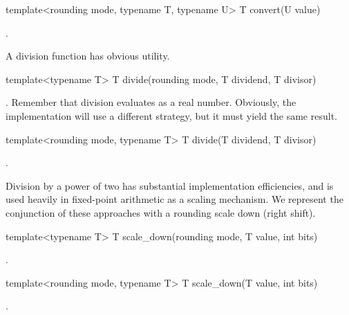 \begin{itemdecl}
template<rounding mode, typename T, typename U> T convert(U value)		
\end{itemdecl}

\begin{itemdescr}
\returns {}.	
\end{itemdescr}

A division function has obvious utility.

\begin{itemdecl}
template<typename T> T divide(rounding mode, T dividend, T divisor)		
\end{itemdecl}

\begin{itemdescr}
\returns {}. Remember that division evaluates as a real number. Obviously, the implementation will use a different strategy, but it must yield the same result.	
\end{itemdescr}

\begin{itemdecl}
template<rounding mode, typename T> T divide(T dividend, T divisor)		
\end{itemdecl}

\begin{itemdescr}
\returns {}.	
\end{itemdescr}

Division by a power of two has substantial implementation efficiencies, and is used heavily in fixed-point arithmetic as a scaling mechanism. We represent the conjunction of these approaches with a rounding scale down (right shift).

\begin{itemdecl}
template<typename T> T scale_down(rounding mode, T value, int bits)		
\end{itemdecl}

\begin{itemdescr}
\returns {}.	
\end{itemdescr}

\begin{itemdecl}
template<rounding mode, typename T> T scale_down(T value, int bits)		
\end{itemdecl}

\begin{itemdescr}
\returns {}.	
\end{itemdescr}

